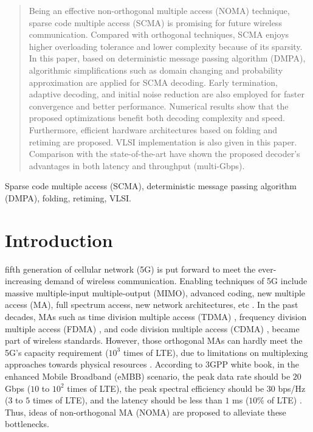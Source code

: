 \documentclass[journal,twoside]{IEEEtran}
\begin{document}
\maketitle

\begin{abstract}
Being an effective non-orthogonal multiple access (NOMA) technique, sparse code multiple access (SCMA) is promising for future wireless communication. Compared with orthogonal techniques, SCMA enjoys higher overloading tolerance and lower complexity because of its sparsity. In this paper, based on deterministic message passing algorithm (DMPA), algorithmic simplifications such as domain changing and probability approximation are applied for SCMA decoding. Early termination, adaptive decoding, and initial noise reduction are also employed for faster convergence and better performance. Numerical results show that the proposed optimizations benefit both decoding complexity and speed. Furthermore, efficient hardware architectures based on folding and retiming are proposed. VLSI implementation is also given in this paper. Comparison with the state-of-the-art have shown the proposed decoder's advantages in both latency and throughput (multi-Gbps).
\end{abstract}

\begin{IEEEkeywords}
Sparse code multiple access (SCMA), deterministic message passing algorithm (DMPA), folding, retiming, VLSI.
\end{IEEEkeywords}

\IEEEpeerreviewmaketitle

\section{Introduction}

 fifth generation of cellular network (5G) is put forward to meet the ever-increasing demand of wireless communication. Enabling techniques of 5G include massive multiple-input multiple-output (MIMO), advanced coding, new multiple access (MA), full spectrum access, new network architectures, etc \cite{5g_tech}. In the past decades, MAs such as time division multiple access (TDMA) \cite{TDMA}, frequency division multiple access (FDMA) \cite{FDMA}, and code division multiple access (CDMA) \cite{CDMA}, became part of wireless standards. However, those orthogonal MAs can hardly meet the 5G's capacity requirement ($10^3$ times of LTE), due to limitations on multiplexing approaches towards physical resources \cite{5g}. According to 3GPP white book, in the enhanced Mobile Broadband (eMBB) scenario, the peak data rate should be $20$ Gbps ($10$ to $10^2$ times of LTE), the peak spectral efficiency should be $30$ bps/Hz ($3$ to $5$ times of LTE), and the latency should be less than $1$ ms ($10\%$ of LTE) \cite{3gpp,3gpp_time}. Thus, ideas of non-orthogonal MA (NOMA) \cite{NOMA_tech} are proposed to alleviate these bottlenecks.
\end{document}

